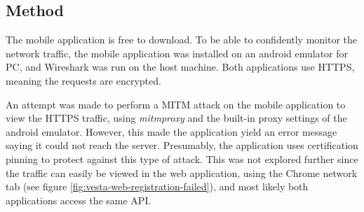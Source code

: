 \subsection{Method}
The mobile application is free to download. To be able to confidently monitor the network traffic, the mobile application was installed on an android emulator for PC, and Wireshark was run on the host machine. Both applications use HTTPS, meaning the requests are encrypted.

An attempt was made to perform a \gls{MITM} attack on the mobile application to view the HTTPS traffic, using \textit{mitmproxy} and the built-in proxy settings of the android emulator. However, this made the application yield an error message saying it could not reach the server. Presumably, the application uses certification pinning to protect against this type of attack. This was not explored further since the traffic can easily be viewed in the web application, using the Chrome network tab (see figure \ref{fig:vesta-web-registration-failed}), and most likely both applications access the same API.

